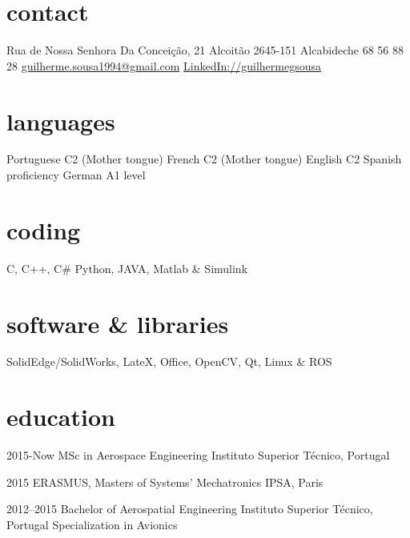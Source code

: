 \documentclass[]{friggeri-cv} %
\begin{document}


\begin{aside} %
\section{contact}
Rua de Nossa Senhora Da Conceição, 21
Alcoitão
2645-151 Alcabideche 68 56 88 28\newline
\href{mailto:guilherme.sousa1994@gmail.com}{guilherme.sousa1994\newline @gmail.com}
\href{https://www.linkedin.com/in/guilhermegsousa}{LinkedIn://guilhermegsousa}
\section{languages}
Portuguese C2 (Mother tongue)
French C2 (Mother tongue)
English C2
Spanish proficiency
German A1 level
\section{coding}
C, C++, C\#
Python,
JAVA, Matlab \& Simulink
\section{software \& libraries}
SolidEdge/SolidWorks,
LateX, Office,
OpenCV, Qt,
Linux \& ROS
\end{aside}


\section{education}

\begin{entrylist}


\entry
{2015-Now}
{MSc {\normalfont in Aerospace Engineering}}
{Instituto Superior Técnico, Portugal}
{\emph{} \\ }%


\entry
{2015}
{ERASMUS, Masters {\normalfont of Systems' Mechatronics} }
{IPSA, Paris}
{\emph{} \\ }

\entry
{2012--2015}
{Bachelor {\normalfont of Aerospatial Engineering}}
{Instituto Superior Técnico, Portugal}
{Specialization in Avionics}


\end{entrylist}
\end{document}
